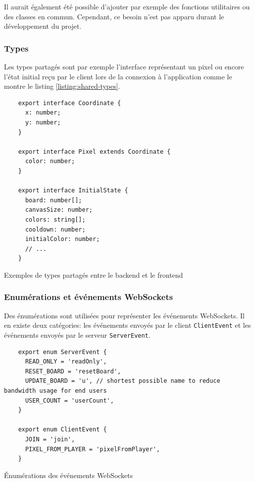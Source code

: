 Il aurait également été possible d'ajouter par exemple des fonctions utilitaires ou des classes en commun. Cependant, ce besoin n'est pas apparu durant le développement du projet.

\subsubsection{Types}

Les types partagés sont par exemple l'interface représentant un pixel ou encore l'état initial reçu par le client lors de la connexion à l'application comme le montre le listing \ref{listing:shared-types}.

\begin{listing}[H]
  \begin{verbatim}
    export interface Coordinate {
      x: number;
      y: number;
    }

    export interface Pixel extends Coordinate {
      color: number;
    }

    export interface InitialState {
      board: number[];
      canvasSize: number;
      colors: string[];
      cooldown: number;
      initialColor: number;
      // ...
    }
\end{verbatim}
  \caption{Exemples de types partagés entre le backend et le frontend}
  \label{listing:shared-types}
\end{listing}

\subsubsection{Enumérations et événements WebSockets}

Des énumérations sont utilisées pour représenter les événements WebSockets. Il en existe deux catégories: les événements envoyés par le client \texttt{ClientEvent} et les événements envoyés par le serveur \texttt{ServerEvent}.

\begin{listing}[H]
  \begin{verbatim}
    export enum ServerEvent {
      READ_ONLY = 'readOnly',
      RESET_BOARD = 'resetBoard',
      UPDATE_BOARD = 'u', // shortest possible name to reduce bandwidth usage for end users
      USER_COUNT = 'userCount',
    }

    export enum ClientEvent {
      JOIN = 'join',
      PIXEL_FROM_PLAYER = 'pixelFromPlayer',
    }
\end{verbatim}
  \caption{Énumérations des événements WebSockets}
  \label{listing:websocket-events-enums}
\end{listing}

